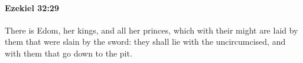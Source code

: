 
		\paragraph{Ezekiel 32:29} %
			\label{EZEKIEL-32-29}

			There is Edom, her kings, and all her princes, which with their might are laid by them that were slain by the sword: they shall lie with the uncircumcised, and with them that go down to the pit.


